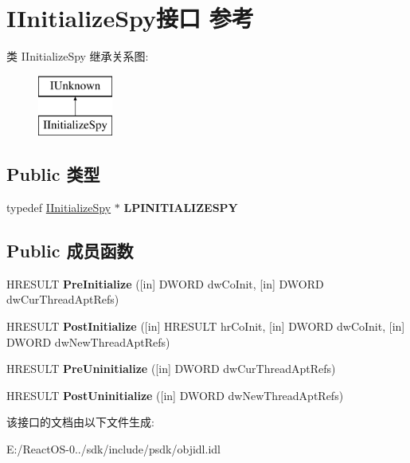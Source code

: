 \hypertarget{interface_i_initialize_spy}{}\section{I\+Initialize\+Spy接口 参考}
\label{interface_i_initialize_spy}
类 I\+Initialize\+Spy 继承关系图\+:\begin{figure}[H]
\begin{center}
\leavevmode
\includegraphics[height=2.000000cm]{interface_i_initialize_spy}
\end{center}
\end{figure}
\subsection*{Public 类型}
\begin{DoxyCompactItemize}
\item 
\mbox{\label{interface_i_initialize_spy_a6bea1992443a45d40304cf7d1638ef9d}} 
typedef \hyperlink{interface_i_initialize_spy}{I\+Initialize\+Spy} $\ast$ {\bfseries L\+P\+I\+N\+I\+T\+I\+A\+L\+I\+Z\+E\+S\+PY}
\end{DoxyCompactItemize}
\subsection*{Public 成员函数}
\begin{DoxyCompactItemize}
\item 
\mbox{\label{interface_i_initialize_spy_a19793a79c419f0148ebf8e28b66223ae}} 
H\+R\+E\+S\+U\+LT {\bfseries Pre\+Initialize} (\mbox{[}in\mbox{]} D\+W\+O\+RD dw\+Co\+Init, \mbox{[}in\mbox{]} D\+W\+O\+RD dw\+Cur\+Thread\+Apt\+Refs)
\item 
\mbox{\label{interface_i_initialize_spy_aae9ab0f346c1e40ba34f19eca00fe071}} 
H\+R\+E\+S\+U\+LT {\bfseries Post\+Initialize} (\mbox{[}in\mbox{]} H\+R\+E\+S\+U\+LT hr\+Co\+Init, \mbox{[}in\mbox{]} D\+W\+O\+RD dw\+Co\+Init, \mbox{[}in\mbox{]} D\+W\+O\+RD dw\+New\+Thread\+Apt\+Refs)
\item 
\mbox{\label{interface_i_initialize_spy_a679f2b615db72e6ac69378d4d52c369c}} 
H\+R\+E\+S\+U\+LT {\bfseries Pre\+Uninitialize} (\mbox{[}in\mbox{]} D\+W\+O\+RD dw\+Cur\+Thread\+Apt\+Refs)
\item 
\mbox{\label{interface_i_initialize_spy_a55a95dc173570ed39399001a98f86647}} 
H\+R\+E\+S\+U\+LT {\bfseries Post\+Uninitialize} (\mbox{[}in\mbox{]} D\+W\+O\+RD dw\+New\+Thread\+Apt\+Refs)
\end{DoxyCompactItemize}


该接口的文档由以下文件生成\+:\begin{DoxyCompactItemize}
\item 
E\+:/\+React\+O\+S-\/0../sdk/include/psdk/objidl.\+idl\end{DoxyCompactItemize}
